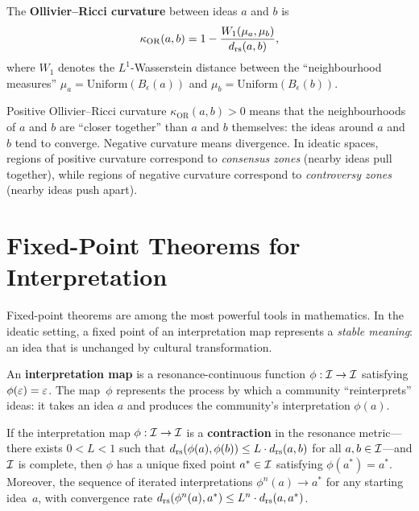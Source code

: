\begin{definition}
\label{def:ricci-curvature}
The \textbf{Ollivier--Ricci curvature} between ideas $a$ and $b$ is
\[
  \kappa_{\mathrm{OR}}(a,b) = 1 - \frac{W_1(\mu_a, \mu_b)}{d_{\mathrm{rs}}(a,b)},
\]
where $W_1$ denotes the $L^1$-Wasserstein distance between the
``neighbourhood measures'' $\mu_a = \mathrm{Uniform}(B_\epsilon(a))$
and $\mu_b = \mathrm{Uniform}(B_\epsilon(b))$.
\end{definition}

\begin{remark}
Positive Ollivier--Ricci curvature $\kappa_{\mathrm{OR}}(a,b) > 0$ means
that the neighbourhoods of $a$ and $b$ are ``closer together'' than $a$ and
$b$ themselves: the ideas around $a$ and $b$ tend to converge.
Negative curvature means divergence.  In ideatic spaces, regions of
positive curvature correspond to \emph{consensus zones} (nearby ideas
pull together), while regions of negative curvature correspond to
\emph{controversy zones} (nearby ideas push apart).
\end{remark}

\section{Fixed-Point Theorems for Interpretation}
\label{sec:fixed-point}

Fixed-point theorems are among the most powerful tools in mathematics.
In the ideatic setting, a fixed point of an interpretation map represents
a \emph{stable meaning}: an idea that is unchanged by cultural
transformation.

\begin{definition}
\label{def:interpretation-map}
An \textbf{interpretation map} is a resonance-continuous function
$\phi : \mathcal{I} \to \mathcal{I}$ satisfying $\phi(\varepsilon) = \varepsilon$.  The map~$\phi$
represents the process by which a community ``reinterprets'' ideas: it
takes an idea $a$ and produces the community's interpretation $\phi(a)$.
\end{definition}

\begin{theorem}
\label{thm:banach-fixed-point}
If the interpretation map $\phi : \mathcal{I} \to \mathcal{I}$ is a \textbf{contraction}
in the resonance metric---there exists $0 < L < 1$ such that
$d_{\mathrm{rs}}(\phi(a), \phi(b)) \le L \cdot d_{\mathrm{rs}}(a,b)$ for all
$a, b \in \mathcal{I}$---and $\mathcal{I}$ is complete, then $\phi$ has a unique
fixed point $a^* \in \mathcal{I}$ satisfying $\phi(a^*) = a^*$.  Moreover,
the sequence of iterated interpretations $\phi^n(a) \to a^*$ for
any starting idea~$a$, with convergence rate $d_{\mathrm{rs}}(\phi^n(a), a^*)
\le L^n \cdot d_{\mathrm{rs}}(a, a^*)$.
\end{theorem}

